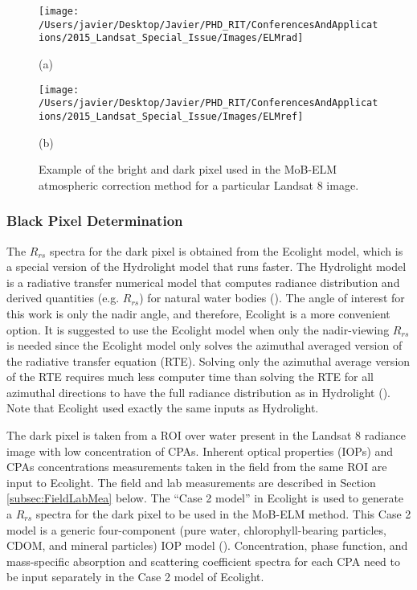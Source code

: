 \documentclass[onecolumn,3p]{elsarticle}
\begin{document}
\begin{figure}[htb]
  \begin{minipage}[c]{0.48\linewidth}
    \centering
      \texttt{[image: /Users/javier/Desktop/Javier/PHD\_RIT/ConferencesAndApplications/2015\_Landsat\_Special\_Issue/Images/ELMrad]}
    \centerline{(a)}\medskip
  \end{minipage}
  \hfill
  \begin{minipage}[d]{0.48\linewidth}
    \centering
      \texttt{[image: /Users/javier/Desktop/Javier/PHD\_RIT/ConferencesAndApplications/2015\_Landsat\_Special\_Issue/Images/ELMref]}
    \centerline{(b)}\medskip
  \end{minipage}
  \caption{Example of the bright and dark pixel used in the MoB-ELM atmospheric correction method for a particular Landsat 8 image.\label{fig:MOBELMpxls} } 
\end{figure}

\subsubsection{Black Pixel Determination}
\label{subsubsec:blackpixel}

The $R_{rs}$ spectra for the dark pixel is obtained from the Ecolight model, which is a special version of the Hydrolight model that runs faster. The Hydrolight model is a radiative transfer numerical model that computes radiance distribution and derived quantities (e.g. $R_{rs}$) for natural water bodies (\cite{MobleyHE}). The angle of interest for this work is only the nadir angle, and therefore, Ecolight is a more convenient option. It is suggested to use the Ecolight model when only the nadir-viewing $R_{rs}$ is needed since the Ecolight model only solves the azimuthal averaged version of the radiative transfer equation (RTE). Solving only the azimuthal average version of the RTE requires much less computer time than solving the RTE for all azimuthal directions to have the full radiance distribution as in Hydrolight (\cite{MobleyHE}). Note that Ecolight used exactly the same inputs as Hydrolight.

The dark pixel is taken from a ROI over water present in the Landsat 8 radiance image with low concentration of CPAs. Inherent optical properties (IOPs) and CPAs concentrations measurements taken in the field from the same ROI are input to Ecolight. The field and lab measurements are described in Section \ref{subsec:FieldLabMea} below. The ``Case 2 model'' in Ecolight is used to generate a $R_{rs}$ spectra for the dark pixel to be used in the MoB-ELM method. This Case 2 model is a generic four-component (pure water, chlorophyll-bearing particles, CDOM, and mineral particles) IOP model (\cite{MobleyHEtech}). Concentration, phase function, and mass-specific absorption and scattering coefficient spectra for each CPA need to be input separately in the Case 2 model of Ecolight. 
\end{document}
